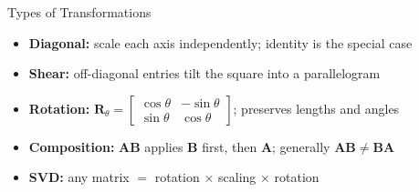 \documentclass[aspectratio=169, professionalfonts]{beamer}
\begin{document}
\begin{frame}{Types of Transformations}
\begin{itemize}
  \item \textbf{Diagonal:} scale each axis independently; identity is the special case
  \item \textbf{Shear:} off-diagonal entries tilt the square into a parallelogram
  \item \textbf{Rotation:} $\mathbf{R}_\theta = \begin{bmatrix}\cos\theta & -\sin\theta \\ \sin\theta & \cos\theta\end{bmatrix}$; preserves lengths and angles
  \item \textbf{Composition:} $\mathbf{A}\mathbf{B}$ applies $\mathbf{B}$ first, then $\mathbf{A}$; generally $\mathbf{A}\mathbf{B} \neq \mathbf{B}\mathbf{A}$
  \item \textbf{SVD:} any matrix $=$ rotation $\times$ scaling $\times$ rotation
\end{itemize}

\end{frame}
\end{document}
